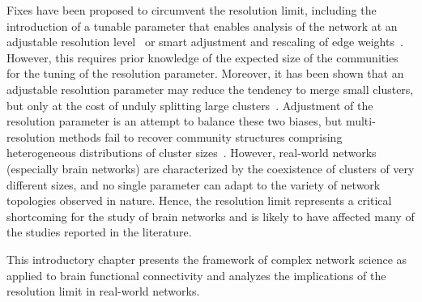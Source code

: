 Fixes have been proposed to circumvent the resolution limit, including the introduction of a tunable parameter that enables analysis of the network at an adjustable resolution level~\cite{reichardt2006,ronhovde2010,yeo2011} or smart adjustment and rescaling of edge weights~\cite{berry2011}.
However, this requires prior knowledge of the expected size of the communities for the tuning of the resolution parameter. Moreover, it has been shown that an  adjustable resolution parameter may reduce the tendency to merge small clusters, but only at the cost of unduly splitting large clusters~\cite{lancichinetti2011}. Adjustment of the resolution parameter is an attempt to balance these two biases, but multi-resolution methods fail to recover community structures comprising heterogeneous distributions of cluster sizes~\cite{lancichinetti2011}. 
However, real-world networks (especially brain networks) are characterized by the coexistence of clusters of very different sizes, and no single parameter can adapt to the variety of network topologies observed in nature.
Hence, the resolution limit represents a critical shortcoming for the study of brain networks and is likely to have affected many of the studies reported in the literature.

This introductory chapter presents the framework of complex network science as applied to brain functional connectivity and analyzes the implications of the resolution limit in real-world networks.



